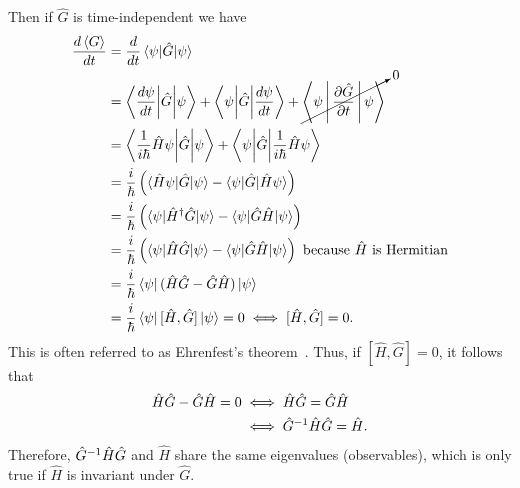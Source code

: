    Then if $\hat{G}$ is time-independent we have
    \begin{align}
        \begin{split}
        \frac{d\braket{G}}{dt} &= \frac{d}{dt}\braket{\psi|\hat{G}|\psi} \\
        &= \Braket{\frac{d\psi}{dt}\biggl|\hat{G}\biggr|\psi} + \Braket{\psi\biggl|\hat{G}\biggr|\frac{d\psi}{dt}} + \cancelto{0}{\Braket{\psi|\frac{\partial \hat{G}}{\partial t}|\psi}} \\
        &= \Braket{\frac{1}{i\hbar}\hat{H}\psi\biggl|\hat{G}\biggr|\psi} + \Braket{\psi\biggl|\hat{G}\biggr|\frac{1}{i\hbar}\hat{H}\psi} \\
        &= \frac{i}{\hbar}\left( \braket{\hat{H}\psi|\hat{G}|\psi} - \braket{\psi|\hat{G}|\hat{H}\psi} \right) \\
        &= \frac{i}{\hbar}\left( \braket{\psi|\hat{H}^\dagger \hat{G}|\psi} - \braket{\psi|\hat{G}\hat{H}|\psi} \right) \\
        &= \frac{i}{\hbar}\left( \braket{\psi|\hat{H}\hat{G}|\psi} - \braket{\psi|\hat{G}\hat{H}|\psi} \right) \textrm{ because }\hat{H}\textrm{ is Hermitian} \\
        &= \frac{i}{\hbar}\bra{\psi}(\hat{H}\hat{G} - \hat{G}\hat{H})\ket{\psi} \\
        &= \frac{i}{\hbar}\bra{\psi}[\hat{H},\hat{G}]\ket{\psi} = 0 \iff [\hat{H},\hat{G}] = 0. \label{eq:cons}
        \end{split}
    \end{align}
    This is often referred to as Ehrenfest's theorem~\cite{Griffiths2018}.
    Thus, if $[\hat{H},\hat{G}]=0$, it follows that
    \begin{align}
        \hat{H}\hat{G}-\hat{G}\hat{H} = 0
            &\iff \hat{H}\hat{G} = \hat{G}\hat{H} \\
            &\iff { \hat{G} }^{-1}\hat{H}\hat{G} = \hat{H}.
    \end{align}
    Therefore, ${ \hat{G} }^{-1}\hat{H}\hat{G}$ and $\hat{H}$ share the same eigenvalues (observables), which is only true if $\hat{H}$ is invariant under $\hat{G}$.

